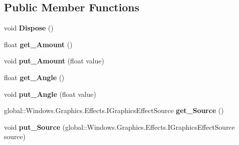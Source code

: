 \subsection*{Public Member Functions}
\begin{DoxyCompactItemize}
\item 
\mbox{\label{class_microsoft_1_1_graphics_1_1_canvas_1_1_effects_1_1_emboss_effect_aa39c97e030897236bc8071c5e9c5de62}} 
void {\bfseries Dispose} ()
\item 
\mbox{\label{class_microsoft_1_1_graphics_1_1_canvas_1_1_effects_1_1_emboss_effect_ad824b28bb284838b16307bbffbeb0668}} 
float {\bfseries get\+\_\+\+Amount} ()
\item 
\mbox{\label{class_microsoft_1_1_graphics_1_1_canvas_1_1_effects_1_1_emboss_effect_a49add22dd56a5fa85ae8c613d6b7561c}} 
void {\bfseries put\+\_\+\+Amount} (float value)
\item 
\mbox{\label{class_microsoft_1_1_graphics_1_1_canvas_1_1_effects_1_1_emboss_effect_a26a7de6dacb9be149789779457828ed3}} 
float {\bfseries get\+\_\+\+Angle} ()
\item 
\mbox{\label{class_microsoft_1_1_graphics_1_1_canvas_1_1_effects_1_1_emboss_effect_ad7260653a41639ec65d5c966c05ba7a2}} 
void {\bfseries put\+\_\+\+Angle} (float value)
\item 
\mbox{\label{class_microsoft_1_1_graphics_1_1_canvas_1_1_effects_1_1_emboss_effect_a36340e7d6e5ac47dd89f4f7d37c07345}} 
global\+::\+Windows.\+Graphics.\+Effects.\+I\+Graphics\+Effect\+Source {\bfseries get\+\_\+\+Source} ()
\item 
\mbox{\label{class_microsoft_1_1_graphics_1_1_canvas_1_1_effects_1_1_emboss_effect_a314ec78bf6cdaad6673cf374c267cdf0}} 
void {\bfseries put\+\_\+\+Source} (global\+::\+Windows.\+Graphics.\+Effects.\+I\+Graphics\+Effect\+Source source)

\end{DoxyCompactItemize}
